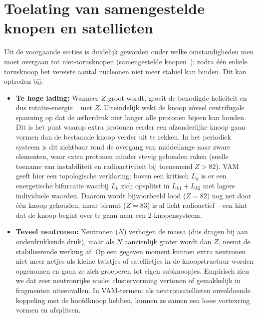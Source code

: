 \section{Toelating van samengestelde knopen en satellieten}

Uit de voorgaande secties is duidelijk geworden onder welke omstandigheden men moet overgaan tot niet-torusknopen (samengestelde knopen~\cite{Faddeev1997KnottedSolitions}): zodra
één enkele torusknoop het vereiste aantal nucleonen niet meer stabiel kan binden. Dit kan optreden bij:

\begin{itemize}
    \item \textbf{Te hoge lading:} Wanneer $Z$ groot wordt, groeit de benodigde heliciteit en dus rotatie-energie ~ met $Z$. Uiteindelijk wekt de knoop zóveel centrifugale spanning op dat de ætherdruk niet langer alle protonen bijeen kan houden. Dit is het punt waarop extra protonen eerder een afzonderlijke knoop gaan vormen dan de bestaande knoop verder uit te rekken. In het periodiek systeem is dit zichtbaar rond de overgang van middellange naar zware elementen, waar extra protonen minder stevig gebonden raken (snelle toename van instabiliteit en radioactiviteit bij toenemend $Z>82$). VAM geeft hier een topologische verklaring: boven een kritisch $L_k$ is er een energetische bifurcatie waarbij $L_k$ zich opsplitst in $L_{k1}+L_{k2}$ met lagere individuele waarden. Daarom wordt bijvoorbeeld lood ($Z=82$) nog net door één knoop gehouden, maar bismut ($Z=83$) is al licht radioactief – een hint dat de knoop begint over te gaan naar een 2-knopensysteem.

    \item \textbf{Teveel neutronen:} Neutronen ($N$) verhogen de massa (dus dragen bij aan onderdrukkende druk), maar als $N$ aanzienlijk groter wordt dan $Z$, neemt de stabiliserende werking af. Op een gegeven moment kunnen extra neutronen niet meer netjes als kleine twistjes of satellietjes in de knoopstructuur worden opgenomen en gaan ze zich groeperen tot eigen subknoopjes. Empirisch zien we dat zeer neutronrijke nuclei clustervorming vertonen of gemakkelijk in fragmenten uiteenvallen. In VAM-termen: als neutronsatellieten onvoldoende koppeling met de hoofdknoop hebben, kunnen ze samen een losse vortexring vormen en afsplitsen.


\end{itemize}
